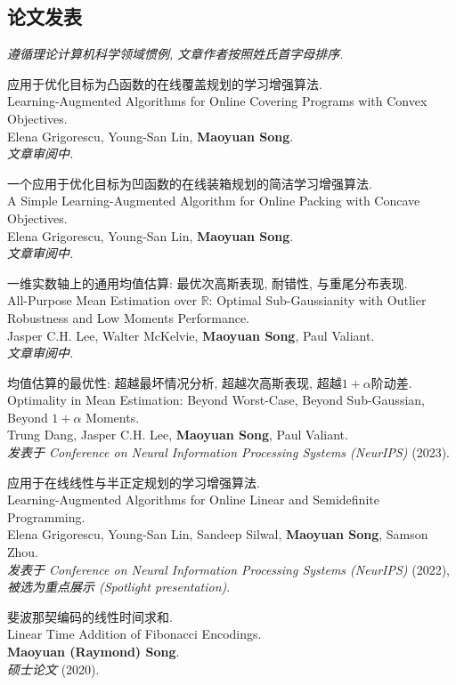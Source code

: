 \documentclass[margin, 10pt]{res} %
\begin{document}
\begin{resume}
\section{论文发表}
{\it 遵循理论计算机科学领域惯例, 文章作者按照姓氏首字母排序.}
\begin{etaremune}
\item 应用于优化目标为凸函数的在线覆盖规划的学习增强算法.\\
Learning-Augmented Algorithms for Online Covering Programs with Convex Objectives.\\
Elena Grigorescu, Young-San Lin, {\bf Maoyuan Song}.\\
\emph{文章审阅中.}
\item 一个应用于优化目标为凹函数的在线装箱规划的简洁学习增强算法.\\
A Simple Learning-Augmented Algorithm for Online Packing with Concave Objectives.\\
Elena Grigorescu, Young-San Lin, {\bf Maoyuan Song}.\\
\emph{文章审阅中.}
\item 一维实数轴上的通用均值估算: 最优次高斯表现, 耐错性, 与重尾分布表现.\\
All-Purpose Mean Estimation over $\mathbb{R}$: Optimal Sub-Gaussianity with Outlier Robustness and Low Moments Performance.\\
Jasper C.H. Lee, Walter McKelvie, {\bf Maoyuan Song}, Paul Valiant.\\
\emph{文章审阅中.}
\item 均值估算的最优性: 超越最坏情况分析, 超越次高斯表现, 超越$1 + \alpha$阶动差.\\
Optimality in Mean Estimation: Beyond Worst-Case, Beyond Sub-Gaussian, Beyond $1 + \alpha$ Moments.\\
Trung Dang, Jasper C.H. Lee, {\bf Maoyuan Song}, Paul Valiant.\\
\emph{发表于 Conference on Neural Information Processing Systems (NeurIPS)} (2023).
\item 应用于在线线性与半正定规划的学习增强算法.\\
Learning-Augmented Algorithms for Online Linear and Semidefinite Programming.\\
Elena Grigorescu, Young-San Lin, Sandeep Silwal, {\bf Maoyuan Song}, Samson Zhou.\\
\emph{发表于 Conference on Neural Information Processing Systems (NeurIPS)} (2022), \emph{被选为重点展示 (Spotlight presentation)}.
\item 斐波那契编码的线性时间求和.\\
Linear Time Addition of Fibonacci Encodings.\\
{\bf Maoyuan (Raymond) Song}.\\
\emph{硕士论文} (2020).
\end{etaremune}


\end{resume}
\end{document}
